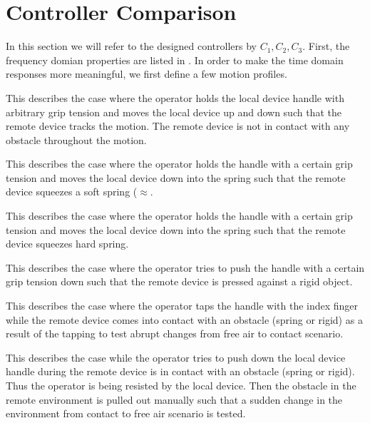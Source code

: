 \let\designthree\empty


\section{Controller Comparison}

In this section we will refer to the designed controllers by $C_1,C_{2},C_3$. First, the frequency domian properties 
are listed in . In order to make the time domain responses more meaningful, we first 
define a few motion profiles.



\begin{description}[leftmargin=!,labelwidth=3.5cm]
  \item[Free air] This describes the case where the operator holds the local device handle with arbitrary grip tension and moves the local 
                  device up and down such that the remote device tracks the motion. The remote device is not in contact with any obstacle
                  throughout the motion. 
  \item[Soft Spring Contact ] This describes the case where the operator holds the handle with a certain grip tension and moves the local 
                              device down into the spring such that the remote device squeezes a soft spring ($\approx$.
  \item[Hard Spring Contact] This describes the case where the operator holds the handle with a certain grip tension and moves the local 
                              device down into the spring such that the remote device squeezes hard spring.
  \item[Rigid Contact] This describes the case where the operator tries to push the handle with a certain grip tension down 
                       such that the remote device is pressed against a rigid object.
  \item[Contact Tapping] This describes the case where the operator taps the handle with the index finger while the remote device 
                         comes into contact with an obstacle (spring or rigid) as a result of the tapping to test abrupt changes 
                         from free air to contact scenario.
  \item[Contact Slide] This describes the case while the operator tries to push down the local device handle during the remote device
                       is in contact with an obstacle (spring or rigid). Thus the operator is being resisted by the local device. Then
                       the obstacle in the remote environment is pulled out manually such that a sudden change in the environment from
                       contact to free air scenario is tested.
\end{description}

